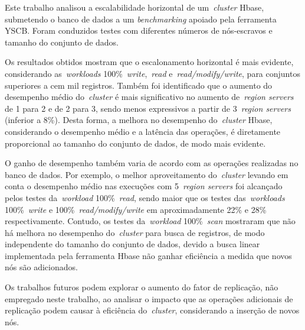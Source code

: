 \documentclass[12pt]{article}
\begin{document}
Este trabalho analisou a escalabilidade horizontal de um~\emph{cluster}  Hbase, submetendo o banco de dados a um \textit{benchmarking} apoiado pela ferramenta YSCB. Foram conduzidos testes com diferentes números de nós-escravos e tamanho do conjunto de dados.

Os resultados obtidos mostram que o escalonamento horizontal é mais evidente, considerando as~\emph{workloads} 100\%~\emph{write},~\emph{read} e~\emph{read/modify/write}, para conjuntos superiores a cem mil registros. Também foi identificado que o aumento do desempenho médio do~\emph{cluster} é mais significativo no aumento de~\emph{region servers} de 1 para 2 e de 2 para 3, sendo menos expressivos a partir de 3~\emph{region servers} (inferior a 8\%). Desta forma, a melhora no desempenho do~\emph{cluster} Hbase, considerando o desempenho médio e a latência das operações, é diretamente proporcional ao tamanho do conjunto de dados, de modo mais evidente.

O ganho de desempenho também varia de acordo com as operações realizadas no banco de dados. Por exemplo, o melhor aproveitamento do~\emph{cluster}  levando em conta o desempenho médio nas execuções com 5~\emph{region servers} foi alcançado pelos testes da~\emph{workload} 100\%~\emph{read}, sendo maior que os testes das~\emph{workloads} 100\%~\emph{write} e 100\%~\emph{read/modify/write} em aproximadamente 22\% e 28\% respectivamente. Contudo, os testes da~\emph{workload} 100\%~\emph{scan} mostraram que não há melhora no desempenho do~\emph{cluster}  para busca de registros, de modo independente do tamanho do conjunto de dados, devido a busca linear implementada pela ferramenta Hbase não ganhar eficiência a medida que novos nós são adicionados.

Os trabalhos futuros podem explorar o aumento do fator de replicação, não empregado neste trabalho, ao analisar o impacto que as operações adicionais de replicação podem causar à eficiência do~\emph{cluster}, considerando a inserção de novos nós.



\end{document}
